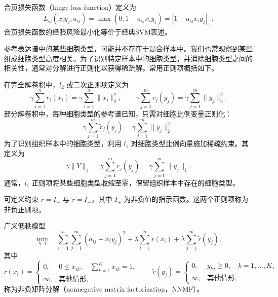 合页损失函数（hinge loss function）定义为
\begin{equation}
L_{ij}(x_iy_j,a_{ij})=\max(0,1-a_{ij}x_iy_j)=|1-a_{ij}x_iy_j|_+.\tag{4.246}
\end{equation}
合页损失函数的经验风险最小化等价于经典SVM表述。

参考表达谱中的某些细胞类型，可能并不存在于混合样本中。我们也常观察到某些组成细胞类型高度相关。为了识别特定样本中的细胞类型，并消除细胞类型之间的相关性，通常对分解进行正则化以获得稀疏解。常用正则项概括如下。

在完全解卷积中，$l_2$ 或二次正则项定义为
\begin{equation}
\gamma\sum_{i=1}^{n}r_i(x_i)=\gamma\sum_{i=1}^{n}\|x_i\|_2^2,
\qquad
\gamma\sum_{j=1}^{m}\widetilde r_j(y_j)=\gamma\sum_{j=1}^{m}\|y_j\|_2^2.\tag{4.247}
\end{equation}
部分解卷积中，每种细胞类型的参考谱已知，只需对细胞比例变量正则化：
\begin{equation}
\gamma\sum_{j=1}^{m}\widetilde r_j(y_j)=\gamma\sum_{j=1}^{m}\|y_j\|_2^2.\tag{4.248}
\end{equation}
为了识别组织样本中的细胞类型，利用 $l_1$ 对细胞类型比例向量施加稀疏约束。其定义为
\begin{equation}
\gamma\|Y\|_1=\gamma\sum_{j=1}^{m}\widetilde r_j(y_j)
=\gamma\sum_{j=1}^{m}\|y_j\|_1.\tag{4.249}
\end{equation}
通常，$l_1$ 正则项将某些细胞类型收缩至零，保留组织样本中存在的细胞类型。

可定义约束 $r=I_+$ 与 $\widetilde r=I_+$，其中 $I_+$ 为非负值的指示函数。这两个正则项称为非负正则项。

广义低秩模型
\begin{equation}
\min_{X,Y}\quad
\sum_{i=1}^{n}\sum_{j=1}^{m}(a_{ij}-x_iy_j)^2
+\lambda\sum_{i=1}^{n}r(x_i)+\lambda\sum_{j=1}^{m}\widetilde r(y_j),\tag{4.250}
\end{equation}
其中
\[
r(x_i)=\begin{cases}0,&0\le x_{ik},\quad\sum_{k=1}^{K}x_{ik}=1,\\
\infty,&\text{其他情形},\end{cases}\qquad
\widetilde r(y_j)=\begin{cases}0,&y_{kj}\ge0,\quad k=1,\ldots,K,\\
\infty,&\text{其他情形},\end{cases}
\]
称为非负矩阵分解（nonnegative matrix factorization，NNMF）。

